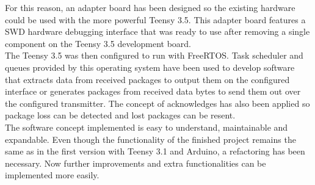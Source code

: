 For this reason, an adapter board has been designed so the existing hardware could be used with the more powerful Teensy 3.5. This  adapter board features a SWD hardware debugging interface that was ready to use after removing a single component on the Teensy 3.5 development board. \\
The Teensy 3.5 was then configured to run with FreeRTOS. Task scheduler and queues provided by this operating system have been used to develop software that extracts data from received packages to output them on the configured interface or generates packages from received data bytes to send them out over the configured transmitter. The concept of acknowledges has also been applied so package loss can be detected and lost packages can be resent. \\
The software concept implemented is easy to understand, maintainable and expandable. Even though the functionality of the finished project remains the same as in the first version with Teensy 3.1 and Arduino, a refactoring has been necessary. Now further improvements and extra functionalities can be implemented more easily. 